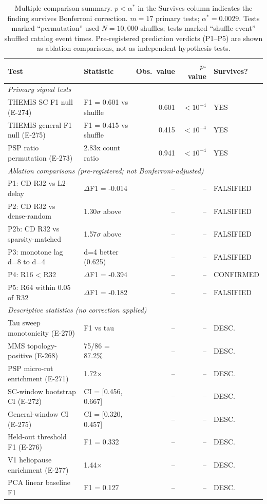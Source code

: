 \documentclass[draft]{agujournal2025}
\begin{document}
\begin{table}[htbp]
\caption{Multiple-comparison summary.  $p < \alpha^*$ in the Survives column
indicates the finding survives Bonferroni correction.  $m=17$ primary tests;
$\alpha^* = 0.0029$.  Tests marked ``permutation'' used $N=10{,}000$ shuffles;
tests marked ``shuffle-event'' shuffled catalog event times.  Pre-registered
prediction verdicts (P1--P5) are shown as ablation comparisons, not as
independent hypothesis tests.}
\label{tab:bonferroni}
\begin{tabular}{llrrl}
\toprule
Test & Statistic & Obs.\ value & $p$-value & Survives? \\
\midrule
\multicolumn{5}{l}{\textit{Primary signal tests}} \\
THEMIS SC F1 null (E-274)       & F1 = 0.601 vs shuffle & 0.601 & $< 10^{-4}$ & YES \\
THEMIS general F1 null (E-275)  & F1 = 0.415 vs shuffle & 0.415 & $< 10^{-4}$ & YES \\
PSP ratio permutation (E-273)   & 2.83x count ratio     & 0.941 & $< 10^{-4}$ & YES \\
\midrule
\multicolumn{5}{l}{\textit{Ablation comparisons (pre-registered; not Bonferroni-adjusted)}} \\
P1: CD R32 vs L2-delay          & $\Delta$F1 = -0.014   & --    & -- & FALSIFIED \\
P2: CD R32 vs dense-random      & 1.30$\sigma$ above    & --    & -- & FALSIFIED \\
P2b: CD R32 vs sparsity-matched & 1.57$\sigma$ above    & --    & -- & FALSIFIED \\
P3: monotone lag d=8 to d=4     & d=4 better (0.625)    & --    & -- & FALSIFIED \\
P4: R16 < R32                   & $\Delta$F1 = -0.394   & --    & -- & CONFIRMED \\
P5: R64 within 0.05 of R32      & $\Delta$F1 = -0.182   & --    & -- & FALSIFIED \\
\midrule
\multicolumn{5}{l}{\textit{Descriptive statistics (no correction applied)}} \\
Tau sweep monotonicity (E-270)  & F1 vs tau             & --    & -- & DESC. \\
MMS topology-positive (E-268)   & 75/86 = 87.2\%        & --    & -- & DESC. \\
PSP micro-rot enrichment (E-271)& 1.72$\times$          & --    & -- & DESC. \\
SC-window bootstrap CI (E-272)  & CI = [0.456, 0.667]   & --    & -- & DESC. \\
General-window CI (E-275)       & CI = [0.320, 0.457]   & --    & -- & DESC. \\
Held-out threshold F1 (E-276)   & F1 = 0.332            & --    & -- & DESC. \\
V1 heliopause enrichment (E-277)& 1.44$\times$          & --    & -- & DESC. \\
PCA linear baseline F1          & F1 = 0.127            & --    & -- & DESC. \\
\bottomrule
\end{tabular}
\end{table}
\end{document}
